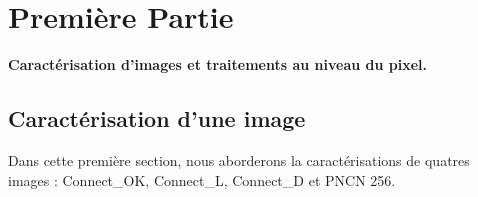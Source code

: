 \documentclass{scrreprt}
\begin{document}
\tableofcontents

\chapter{Première Partie}

\begin{center}
\large{
\textbf{Caractérisation d’images et traitements au niveau du pixel.}}
\end{center}

\section{Caractérisation d'une image}

Dans cette première section, nous aborderons la caractérisations de quatres images : Connect_OK, Connect_L,
Connect_D et PNCN 256. 	
\end{document}
